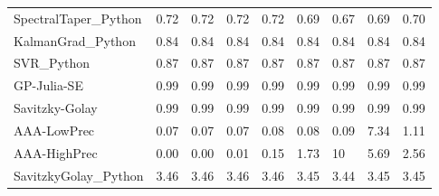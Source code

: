 \begin{table}
\begin{tabular}{lllllllll}
SpectralTaper_Python & 0.72 & 0.72 & 0.72 & 0.72 & 0.69 & 0.67 & 0.69 & 0.70 \\
KalmanGrad_Python & 0.84 & 0.84 & 0.84 & 0.84 & 0.84 & 0.84 & 0.84 & 0.84 \\
SVR_Python & 0.87 & 0.87 & 0.87 & 0.87 & 0.87 & 0.87 & 0.87 & 0.87 \\
GP-Julia-SE & 0.99 & 0.99 & 0.99 & 0.99 & 0.99 & 0.99 & 0.99 & 0.99 \\
Savitzky-Golay & 0.99 & 0.99 & 0.99 & 0.99 & 0.99 & 0.99 & 0.99 & 0.99 \\
AAA-LowPrec & 0.07 & 0.07 & 0.07 & 0.08 & 0.08 & 0.09 & 7.34 & 1.11 \\
AAA-HighPrec & 0.00 & 0.00 & 0.01 & 0.15 & 1.73 & 10 & 5.69 & 2.56 \\
SavitzkyGolay_Python & 3.46 & 3.46 & 3.46 & 3.46 & 3.45 & 3.44 & 3.45 & 3.45 \\
\bottomrule
\end{tabular}
\end{table}
